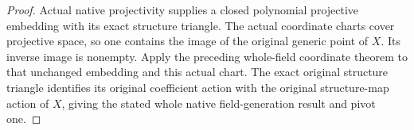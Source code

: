 \begin{proof}
Actual native projectivity supplies a closed polynomial
projective embedding with its exact structure triangle.
The actual coordinate charts cover projective space, so
one contains the image of the original generic point of
$X$. Its inverse image is nonempty. Apply the preceding
whole-field coordinate theorem to that unchanged embedding
and this actual chart. The exact original structure
triangle identifies its original coefficient action with
the original structure-map action of $X$, giving the stated
whole native field-generation result and pivot one.
\end{proof}
